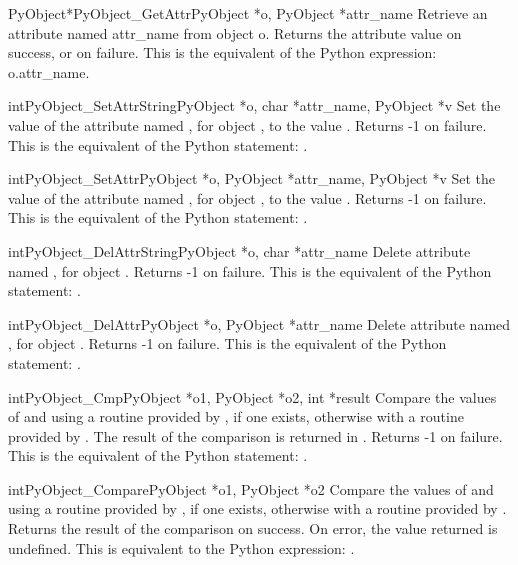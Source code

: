 \documentclass[twoside,openright]{report}
\begin{document}
\begin{cfuncdesc}{PyObject*}{PyObject_GetAttr}{PyObject *o, PyObject *attr_name}
Retrieve an attribute named attr_name from object o.
Returns the attribute value on success, or \NULL{} on failure.
This is the equivalent of the Python expression: o.attr_name.
\end{cfuncdesc}


\begin{cfuncdesc}{int}{PyObject_SetAttrString}{PyObject *o, char *attr_name, PyObject *v}
Set the value of the attribute named , for object ,
to the value . Returns -1 on failure.  This is
the equivalent of the Python statement: .
\end{cfuncdesc}


\begin{cfuncdesc}{int}{PyObject_SetAttr}{PyObject *o, PyObject *attr_name, PyObject *v}
Set the value of the attribute named , for
object ,
to the value . Returns -1 on failure.  This is
the equivalent of the Python statement: .
\end{cfuncdesc}


\begin{cfuncdesc}{int}{PyObject_DelAttrString}{PyObject *o, char *attr_name}
Delete attribute named , for object . Returns -1 on
failure.  This is the equivalent of the Python
statement: .
\end{cfuncdesc}


\begin{cfuncdesc}{int}{PyObject_DelAttr}{PyObject *o, PyObject *attr_name}
Delete attribute named , for object . Returns -1 on
failure.  This is the equivalent of the Python
statement: .
\end{cfuncdesc}


\begin{cfuncdesc}{int}{PyObject_Cmp}{PyObject *o1, PyObject *o2, int *result}
Compare the values of  and  using a routine provided by
, if one exists, otherwise with a routine provided by .
The result of the comparison is returned in .  Returns
-1 on failure.  This is the equivalent of the Python
statement: .
\end{cfuncdesc}


\begin{cfuncdesc}{int}{PyObject_Compare}{PyObject *o1, PyObject *o2}
Compare the values of  and  using a routine provided by
, if one exists, otherwise with a routine provided by .
Returns the result of the comparison on success.  On error,
the value returned is undefined. This is equivalent to the
Python expression: .
\end{cfuncdesc}
\end{document}
